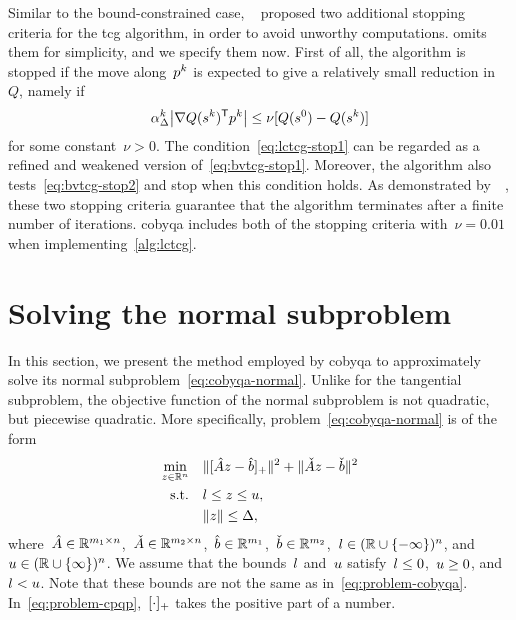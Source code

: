 Similar to the bound-constrained case, ~\cite[\S~2]{Powell_2015} proposed two additional stopping criteria for the \gls{tcg} algorithm, in order to avoid unworthy computations.
 omits them for simplicity, and we specify them now.
First of all, the algorithm is stopped if the move along~$\pstep[k]$ is expected to give a relatively small reduction in~$Q$, namely if
\begin{equation}
    \label{eq:lctcg-stop1}
    \alpha_{\rad}^k \abs[\big]{\nabla Q(\sstep[k])^{\T} \pstep[k]} \le \nu [Q(\sstep[0]) - Q(\sstep[k])]
\end{equation}
for some constant~$\nu > 0$.
The condition~\cref{eq:lctcg-stop1} can be regarded as a refined and weakened version of~\cref{eq:bvtcg-stop1}.
Moreover, the algorithm also tests~\cref{eq:bvtcg-stop2} and stop when this condition holds.
As demonstrated by~\citeauthor{Powell_2015}~\cite[\S~5]{Powell_2015}, these two stopping criteria guarantee that the algorithm terminates after a finite number of iterations.
\Gls{cobyqa} includes both of the stopping criteria with~$\nu = 0.01$ when implementing~\cref{alg:lctcg}.

\section{Solving the normal subproblem}
\label{sec:cobyqa-normal}

In this section, we present the method employed by \gls{cobyqa} to approximately solve its normal subproblem~\cref{eq:cobyqa-normal}.
Unlike for the tangential subproblem, the objective function of the normal subproblem is not quadratic, but piecewise quadratic.
More specifically, problem~\cref{eq:cobyqa-normal} is of the form
\begin{subequations}
    \label{eq:problem-cpqp}
    \begin{align}
        \min_{z \in \R^n}   & \quad \norm{\posp{\hat{A} z - \hat{b}}}^2 + \norm{\check{A} z - \check{b}}^2\\
        \text{s.t.}         & \quad \xl \le z \le \xu,\\
                            & \quad \norm{z} \le \rad,
    \end{align}
\end{subequations}
where~$\hat{A} \in \mathbb{R}^{m_1 \times n}$,~$\check{A} \in \mathbb{R}^{m_2 \times n}$,~$\hat{b} \in \mathbb{R}^{m_1}$,~$\check{b} \in \mathbb{R}^{m_2}$,~$l \in (\mathbb{R} \cup \{-\infty\})^n$, and~$u \in (\mathbb{R} \cup \{\infty\})^n$.
We assume that the bounds~$l$ and~$u$ satisfy~$l \le 0$,~$u \ge 0$, and~$l < u$.
Note that these bounds are not the same as in~\cref{eq:problem-cobyqa}.
In~\cref{eq:problem-cpqp},~$[\cdot]_+$ takes the positive part of a number.

